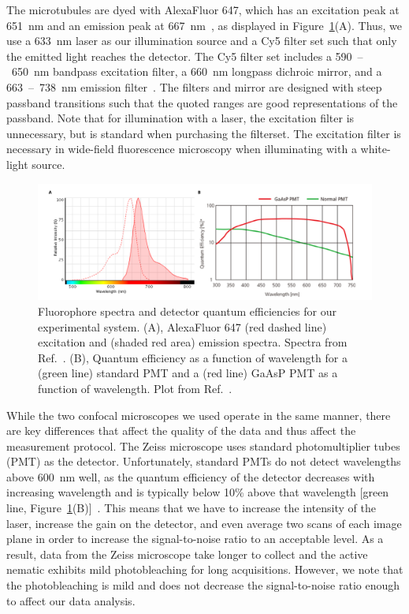 The microtubules are dyed with AlexaFluor 647, which has an excitation peak at 651~nm and an emission peak at 667~nm~\cite{RN264}, as displayed in Figure~\ref{f:3-Spectra}(A).
Thus, we use a 633~nm laser as our illumination source and a Cy5 filter set such that only the emitted light reaches the detector.
The Cy5 filter set includes a 590~--~650~nm bandpass excitation filter, a 660~nm longpass dichroic mirror, and a 663~--~738~nm emission filter~\cite{RN263}.
The filters and mirror are designed with steep passband transitions such that the quoted ranges are good representations of the passband.
Note that for illumination with a laser, the excitation filter is unnecessary, but is standard when purchasing the filterset.
The excitation filter is necessary in wide-field fluorescence microscopy when illuminating with a white-light source.
\begin{figure}
  \centering
  \includegraphics{figures/C3/Ch3-Figs_Spectra.png}
  \caption{Fluorophore spectra and detector quantum efficiencies for our experimental system.
  (A), AlexaFluor 647 (red dashed line) excitation and (shaded red area) emission spectra.
  Spectra from Ref.~\cite{RN264}.
  (B), Quantum efficiency as a function of wavelength for a (green line) standard PMT and a (red line) GaAsP PMT as a function of wavelength.
  Plot from Ref.~\cite{RN263}.}\label{f:3-Spectra}
\end{figure}

While the two confocal microscopes we used operate in the same manner, there are key differences that affect the quality of the data and thus affect the measurement protocol.
The Zeiss microscope uses standard photomultiplier tubes (PMT) as the detector.
Unfortunately, standard PMTs do not detect wavelengths above 600~nm well, as the quantum efficiency of the detector decreases with increasing wavelength and is typically below 10\% above that wavelength [green line, Figure~\ref{f:3-Spectra}(B)]~\cite{RN263}.
This means that we have to increase the intensity of the laser, increase the gain on the detector, and even average two scans of each image plane in order to increase the signal-to-noise ratio to an acceptable level.
As a result, data from the Zeiss microscope take longer to collect and the active nematic exhibits mild photobleaching for long acquisitions.
However, we note that the photobleaching is mild and does not decrease the signal-to-noise ratio enough to affect our data analysis.

